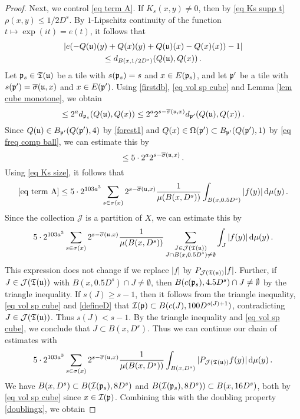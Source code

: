 \begin{proof}
    Next, we control \eqref{eq term A}. If $K_s(x,y)\neq 0$, then by \eqref{eq Ks supp t} $\rho(x,y)\leq 1/2 D^s$. By $1$-Lipschitz continuity of the function $t \mapsto \exp(it) = e(t)$, it follows that
    \begin{multline*}
        |e(-Q(\mathfrak u)(y)+Q(x)(y)+Q(\mathfrak u)(x)-Q(x)(x))-1|\\
        \leq d_{B(x, 1/2 D^{s})}(Q(\mathfrak u), Q(x))\,.
    \end{multline*}
    Let $\mathfrak p_s \in \mathfrak T(\mathfrak u)$ be a tile with $s(\mathfrak p_s) = s$ and $x \in E(\mathfrak p_s)$, and let $\mathfrak p'$ be a tile with $s(\mathfrak p') = \overline{\sigma}(\mathfrak u, x)$ and $x \in E(\mathfrak p')$.
    Using \eqref{firstdb}, \eqref{eq vol sp cube} and Lemma \ref{lem cube monotone}, we obtain
    $$
        \le 2^a d_{\mathfrak p_s}(Q(\mathfrak u), Q(x)) \le 2^{a} 2^{s - \overline{\sigma}(\mathfrak u, x)} d_{\mathfrak p'}(Q(\mathfrak u), Q(x))\,.
    $$
    Since $Q(\mathfrak u) \in B_{\mathfrak p'}(Q(\mathfrak p'), 4)$ by \eqref{forest1} and $Q(x) \in \Omega(\mathfrak p') \subset B_{\mathfrak p'}(Q(\mathfrak p'), 1)$ by \eqref{eq freq comp ball}, we can estimate this by
    $$
        \le 5 \cdot 2^{a} 2^{s - \overline{\sigma}(\mathfrak u, x)} \,.
    $$
    Using \eqref{eq Ks size}, it follows that
    $$
        \eqref{eq term A} \le 5\cdot 2^{103a^3} \sum_{s\in\sigma(x)}2^{s - \overline{\sigma}(\mathfrak u, x)} \frac{1}{\mu(B(x,D^s))}\int_{B(x,0.5D^{s})}|f(y)|\,\mathrm{d}\mu(y)\,.
    $$
    Since the collection $\mathcal{J}$ is a partition of $X$, we can estimate this by
    $$
         5\cdot 2^{103a^3} \sum_{s\in\sigma(x)}2^{s - \overline{\sigma}(\mathfrak u, x)} \frac{1}{\mu(B(x,D^s))}\sum_{\substack{J \in \mathcal{J}(\mathfrak T(\mathfrak u))\\J \cap B(x, 0.5D^s) \ne \emptyset} }\int_{J}|f(y)|\,\mathrm{d}\mu(y)\,.
    $$
    This expression does not change if we replace $|f|$ by $P_{\mathcal{J}(\mathfrak T(\mathfrak u))}|f|$. Further, if $J \in \mathcal{J}(\mathfrak T(\mathfrak u))$ with $B(x, 0.5 D^s) \cap J \ne \emptyset$, then $B(c(\mathfrak p_s), 4.5D^s) \cap J \ne \emptyset$ by the triangle inequality. If $s(J) \ge s - 1$, then it follows from the triangle inequality, \eqref{eq vol sp cube} and \eqref{defineD} that $\mathcal{I}(\mathfrak p) \subset B(c(J), 100 D^{s(J)+1})$, contradicting $J \in \mathcal{J}(\mathfrak{T}(\mathfrak u))$. Thus $s(J) < s - 1$. By the triangle inequality and \eqref{eq vol sp cube}, we conclude that $J \subset B(x, D^s)$. Thus we can continue our chain of estimates with
    $$
        5\cdot 2^{103a^3} \sum_{s\in\sigma(x)}2^{s - \overline{\sigma}(\mathfrak u, x)} \frac{1}{\mu(B(x,D^s))}\int_{B(x,D^s)}|P_{\mathcal{J}(\mathfrak T(\mathfrak u))}f(y)|\,\mathrm{d}\mu(y)\,.
    $$
    We have $B(x, D^s) \subset B(\mathcal{I}(\mathfrak p_s), 8D^s)$ and $B(\mathcal{I}(\mathfrak p_s), 8D^s)) \subset B(x, 16D^s)$, both by \eqref{eq vol sp cube} since $x \in \mathcal{I}(\mathfrak p)$. Combining this with the doubling property \eqref{doublingx}, we obtain

\end{proof}
